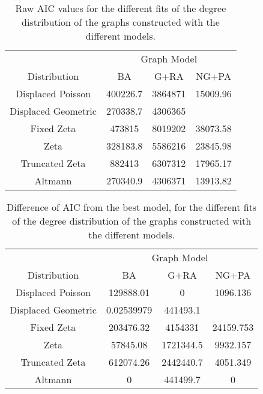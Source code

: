 \begin{table}[H]
\centering
\begin{tabular}{cccc}
                                         & \multicolumn{3}{c}{Graph Model} \\
\multicolumn{1}{c|}{Distribution}        & BA        & G+RA     & NG+PA    \\ \hline
\multicolumn{1}{c|}{Displaced Poisson}   & 400226.7  & 3864871  & 15009.96 \\
\multicolumn{1}{c|}{Displaced Geometric} & 270338.7  & 4306365  &          \\
\multicolumn{1}{c|}{Fixed Zeta}          & 473815    & 8019202  & 38073.58 \\
\multicolumn{1}{c|}{Zeta}                & 328183.8  & 5586216  & 23845.98 \\
\multicolumn{1}{c|}{Truncated Zeta}      & 882413    & 6307312  & 17965.17 \\
\multicolumn{1}{c|}{Altmann}             & 270340.9  & 4306371  & 13913.82
\end{tabular}
\caption{Raw AIC values for the different fits of the degree distribution of the graphs constructed with the different models.}
\label{tab:degseq_AIC}
\end{table}


\begin{table}[H]
\centering
\begin{tabular}{cccc}
                                         & \multicolumn{3}{c}{Graph Model}    \\
\multicolumn{1}{c|}{Distribution}        & BA         & G+RA      & NG+PA     \\ \hline
\multicolumn{1}{c|}{Displaced Poisson}   & 129888.01  & 0         & 1096.136  \\
\multicolumn{1}{c|}{Displaced Geometric} & 0.02539979 & 441493.1  &           \\
\multicolumn{1}{c|}{Fixed Zeta}          & 203476.32  & 4154331   & 24159.753 \\
\multicolumn{1}{c|}{Zeta}                & 57845.08   & 1721344.5 & 9932.157  \\
\multicolumn{1}{c|}{Truncated Zeta}      & 612074.26  & 2442440.7 & 4051.349  \\
\multicolumn{1}{c|}{Altmann}             & 0          & 441499.7  & 0        
\end{tabular}
\caption{Difference of AIC from the best model, for the different fits of the degree distribution of the graphs constructed with the different models.}
\label{tab:degseq_diff}
\end{table}